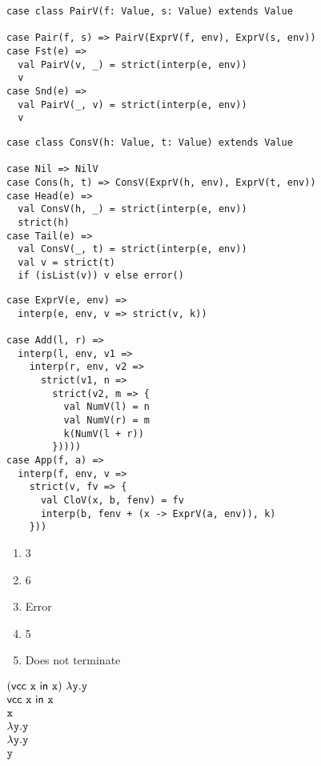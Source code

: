 \textbf{}
\vspace{-1em}
\begin{verbatim}
case class PairV(f: Value, s: Value) extends Value

case Pair(f, s) => PairV(ExprV(f, env), ExprV(s, env))
case Fst(e) =>
  val PairV(v, _) = strict(interp(e, env))
  v
case Snd(e) =>
  val PairV(_, v) = strict(interp(e, env))
  v
\end{verbatim}

\textbf{}
\vspace{-1em}
\begin{verbatim}
case class ConsV(h: Value, t: Value) extends Value

case Nil => NilV
case Cons(h, t) => ConsV(ExprV(h, env), ExprV(t, env))
case Head(e) =>
  val ConsV(h, _) = strict(interp(e, env))
  strict(h)
case Tail(e) =>
  val ConsV(_, t) = strict(interp(e, env))
  val v = strict(t)
  if (isList(v)) v else error()
\end{verbatim}

\textbf{}
\vspace{-1em}
\begin{verbatim}
case ExprV(e, env) =>
  interp(e, env, v => strict(v, k))

case Add(l, r) =>
  interp(l, env, v1 =>
    interp(r, env, v2 =>
      strict(v1, n =>
        strict(v2, m => {
          val NumV(l) = n
          val NumV(r) = m
          k(NumV(l + r))
        }))))
case App(f, a) =>
  interp(f, env, v =>
    strict(v, fv => {
      val CloV(x, b, fenv) = fv
      interp(b, fenv + (x -> ExprV(a, env)), k)
    }))
\end{verbatim}

\textbf{}
\begin{enumerate}
  \item 3
  \item 6
  \item Error
  \item 5
  \item Does not terminate
\end{enumerate}

\textbf{}

$\begin{array}{@{}l}
  \eapp{(\evcc{\cx}{\cx})}{\efun{\cy}{\cy}} \\
  \evcc{\cx}{\cx} \\
  \cx \\
  \efun{\cy}{\cy} \\
  \efun{\cy}{\cy} \\
  \cy \\
\end{array}$
\\

